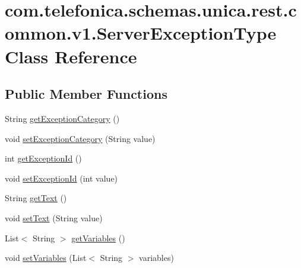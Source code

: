 \hypertarget{classcom_1_1telefonica_1_1schemas_1_1unica_1_1rest_1_1common_1_1v1_1_1ServerExceptionType}{
\section{com.telefonica.schemas.unica.rest.common.v1.ServerExceptionType Class Reference}
\label{classcom_1_1telefonica_1_1schemas_1_1unica_1_1rest_1_1common_1_1v1_1_1ServerExceptionType}
}
\subsection*{Public Member Functions}
\begin{DoxyCompactItemize}
\item 
String \hyperlink{classcom_1_1telefonica_1_1schemas_1_1unica_1_1rest_1_1common_1_1v1_1_1ServerExceptionType_a98ebd864f4632a8d984574374ecab39b}{getExceptionCategory} ()
\item 
void \hyperlink{classcom_1_1telefonica_1_1schemas_1_1unica_1_1rest_1_1common_1_1v1_1_1ServerExceptionType_a9170a0066c1cd9023dc26e20eff9cd28}{setExceptionCategory} (String value)
\item 
int \hyperlink{classcom_1_1telefonica_1_1schemas_1_1unica_1_1rest_1_1common_1_1v1_1_1ServerExceptionType_ae49785e25cefcefe30745d242e508a72}{getExceptionId} ()
\item 
void \hyperlink{classcom_1_1telefonica_1_1schemas_1_1unica_1_1rest_1_1common_1_1v1_1_1ServerExceptionType_a12ec9b210bbd302ec4a77b3731b53965}{setExceptionId} (int value)
\item 
String \hyperlink{classcom_1_1telefonica_1_1schemas_1_1unica_1_1rest_1_1common_1_1v1_1_1ServerExceptionType_a84ef0aff73e4fea3260637bde1caf010}{getText} ()
\item 
void \hyperlink{classcom_1_1telefonica_1_1schemas_1_1unica_1_1rest_1_1common_1_1v1_1_1ServerExceptionType_a3fa48337566e337421bc007785383777}{setText} (String value)
\item 
List$<$ String $>$ \hyperlink{classcom_1_1telefonica_1_1schemas_1_1unica_1_1rest_1_1common_1_1v1_1_1ServerExceptionType_a3ef0b27e7b03048905bb1c1b32a81940}{getVariables} ()
\item 
void \hyperlink{classcom_1_1telefonica_1_1schemas_1_1unica_1_1rest_1_1common_1_1v1_1_1ServerExceptionType_ab8ad400a7807f75681d3ad58663a9286}{setVariables} (List$<$ String $>$ variables)
\end{DoxyCompactItemize}
